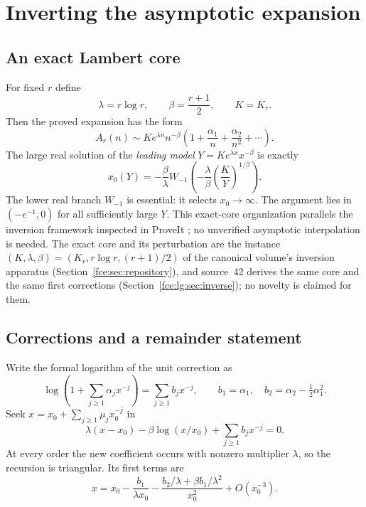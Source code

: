 \documentclass[11pt,a4paper]{article}
\numberwithin{equation}{section}
\theoremstyle{definition}\newtheorem{definition}[theorem]{Definition}
\theoremstyle{remark}\newtheorem{remark}[theorem]{Remark}
\begin{document}
\section{Inverting the asymptotic expansion}\label{fce:sec:inverse}
\subsection{An exact Lambert core}
For fixed $r$ define
\[
 \lambda=r\log r,\qquad \beta=\frac{r+1}{2},\qquad K=K_r.
\]
Then the proved expansion has the form
\begin{equation}\label{fce:eq:genericexpansion}
 A_r(n)\sim K e^{\lambda n}n^{-\beta}
          \left(1+\frac{\alpha_1}{n}+\frac{\alpha_2}{n^2}+\cdots\right).
\end{equation}
The large real solution of the \emph{leading model}
$Y=Ke^{\lambda x}x^{-\beta}$ is exactly
\begin{equation}\label{fce:eq:lambertcore}
 x_0(Y)=-\frac{\beta}{\lambda}
 W_{-1}\!\left(-\frac{\lambda}{\beta}
                  \left(\frac K Y\right)^{1/\beta}\right).
\end{equation}
The lower real branch $W_{-1}$ is essential: it selects $x_0\to\infty$.
The argument lies in $(-e^{-1},0)$ for all sufficiently large $Y$.
This exact-core organization parallels the inversion framework inspected
in ProveIt \cite{proveit}; no unverified asymptotic interpolation is needed.
The exact core and its perturbation are the instance
$(K,\lambda,\beta)=(K_r,r\log r,(r+1)/2)$ of the canonical volume's
inversion apparatus (Section~\ref{fce:sec:repository}), and source~42
derives the same core and the same first corrections
(Section~\ref{fce:lg:sec:inverse}); no novelty is claimed for them.

\subsection{Corrections and a remainder statement}
Write the formal logarithm of the unit correction as
\[
 \log\left(1+\sum_{j\ge1}\alpha_jx^{-j}\right)
       =\sum_{j\ge1}b_jx^{-j},\qquad
 b_1=\alpha_1,\quad b_2=\alpha_2-\tfrac12\alpha_1^2.
\]
Seek $x=x_0+\sum_{j\ge1}\mu_jx_0^{-j}$ in
\begin{equation}\label{fce:eq:inversecorrectioneq}
 \lambda(x-x_0)-\beta\log(x/x_0)+\sum_{j\ge1}b_jx^{-j}=0.
\end{equation}
At every order the new coefficient occurs with nonzero multiplier
$\lambda$, so the recursion is triangular. Its first terms are
\begin{equation}\label{fce:eq:inversefirst}
 x=x_0-\frac{b_1}{\lambda x_0}
 -\frac{b_2/\lambda+\beta b_1/\lambda^2}{x_0^2}
 +O(x_0^{-3}).
\end{equation}
\end{document}
